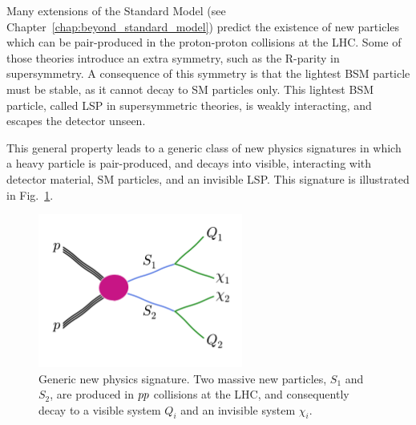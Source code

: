 

Many extensions of the Standard Model (see Chapter~\ref{chap:beyond_standard_model}) predict the 
existence of new particles which can be pair-produced in the proton-proton collisions at the LHC. 
Some of those theories introduce an extra symmetry, such as the R-parity in supersymmetry. A
consequence of this symmetry is that the lightest BSM particle must be stable, as it cannot decay
to SM particles only. This lightest BSM particle, called LSP in supersymmetric theories, is weakly
interacting, and escapes the detector unseen. 

This general property leads to a generic class of new physics signatures in which a heavy
particle is pair-produced, and decays into visible, \ie interacting with detector material, SM
particles, and an invisible LSP. This signature is illustrated in Fig.~\ref{fig:razor_signature}.

\begin{figure}[htb]
  \centering
  \includegraphics[width=0.6\textwidth,clip=true,trim=0 1.8cm 0
0.8cm]{figures/razor_variables/signature} 
  \caption{Generic new physics signature. Two massive new particles, $S_1$ and $S_2$, are produced
in ${p}{p}$ collisions at the LHC, and consequently decay to a visible system $Q_i$ and an invisible
system $\chi_i$. \label{fig:razor_signature}}
\end{figure}


